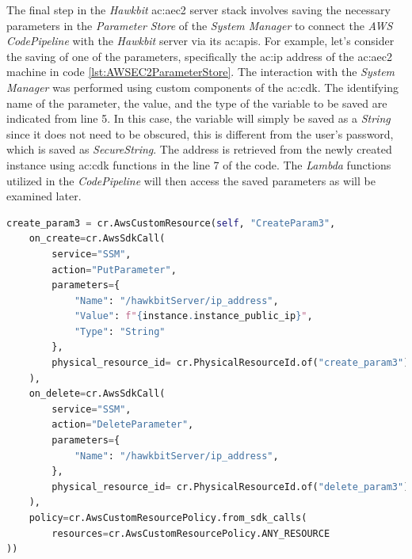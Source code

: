 The final step in the \textit{Hawkbit} \gls{ac:aec2} server stack involves saving the necessary parameters in the \textit{Parameter Store} of the \textit{System Manager} to connect the \textit{AWS CodePipeline} with the \textit{Hawkbit} server via its \gls{ac:api}s. For example, let's consider the saving of one of the parameters, specifically the \gls{ac:ip} address of the \gls{ac:aec2} machine in code \ref{lst:AWSEC2ParameterStore}. The interaction with the \textit{System Manager} was performed using custom components of the \gls{ac:cdk}. The identifying name of the parameter, the value, and the type of the variable to be saved are indicated from line 5. In this case, the variable will simply be saved as a \textit{String} since it does not need to be obscured, this is different from the user's password, which is saved as \textit{SecureString}. The address is retrieved from the newly created instance using \gls{ac:cdk} functions in the line 7 of the code. The \textit{Lambda} functions utilized in the \textit{CodePipeline} will then access the saved parameters as will be examined later.
\begin{lstlisting}[language=Python, caption={Code for the Parameter Store parameters creation}, label=lst:AWSEC2ParameterStore]
    create_param3 = cr.AwsCustomResource(self, "CreateParam3",
    on_create=cr.AwsSdkCall(
        service="SSM",
        action="PutParameter",
        parameters={
            "Name": "/hawkbitServer/ip_address",
            "Value": f"{instance.instance_public_ip}",
            "Type": "String"
        },
        physical_resource_id= cr.PhysicalResourceId.of("create_param3")
    ),
    on_delete=cr.AwsSdkCall(
        service="SSM",
        action="DeleteParameter",
        parameters={
            "Name": "/hawkbitServer/ip_address",
        },
        physical_resource_id= cr.PhysicalResourceId.of("delete_param3")
    ),
    policy=cr.AwsCustomResourcePolicy.from_sdk_calls(
        resources=cr.AwsCustomResourcePolicy.ANY_RESOURCE
))
\end{lstlisting}

